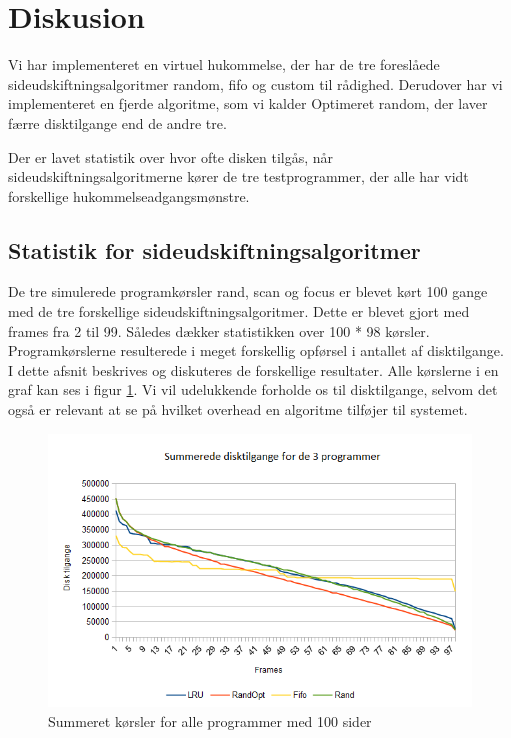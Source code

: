 \section{Diskusion}
\label{sec:diskusion}
Vi har implementeret en virtuel hukommelse, der har de tre foreslåede sideudskiftningsalgoritmer random, fifo og custom til rådighed. Derudover har vi implementeret en fjerde algoritme, som vi kalder Optimeret random, der laver færre disktilgange end de andre tre.

Der er lavet statistik over hvor ofte disken tilgås, når sideudskiftningsalgoritmerne kører de tre testprogrammer, der alle har vidt forskellige hukommelseadgangsmønstre. 

\subsection{Statistik for sideudskiftningsalgoritmer}
\label{subsec:statistik}
De tre simulerede programkørsler rand, scan og focus er blevet kørt 100 gange med de tre forskellige sideudskiftningsalgoritmer. Dette er blevet gjort med frames fra 2 til 99. Således dækker statistikken over 100 * 98 kørsler. 
Programkørslerne resulterede i meget forskellig opførsel i antallet af disktilgange. I dette afsnit beskrives og diskuteres de forskellige resultater. Alle kørslerne i en graf kan ses i figur \ref{fig:all}. Vi vil udelukkende forholde os til disktilgange, selvom det også er relevant at se på hvilket overhead en algoritme tilføjer til systemet.


\begin{figure}[ht]
\centerline{\includegraphics[scale=0.8]{graph/stat_all}}
\caption{Summeret kørsler for alle programmer med 100 sider}
\label{fig:all}
\end{figure}

